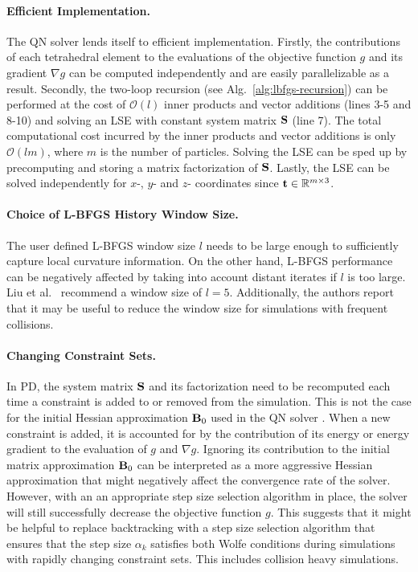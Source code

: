 \paragraph{Efficient Implementation.}
The QN solver lends itself to efficient implementation. Firstly, the contributions of each tetrahedral element to the evaluations of the objective function $g$ 
and its gradient $\nabla g$ can be computed independently and are easily parallelizable as a result. Secondly, the two-loop recursion (see Alg.\ 
\ref{alg:lbfgs-recursion}) can be performed at the cost of $\mathcal{O}(l)$ inner products and vector additions (lines 3-5 and 8-10) and solving an LSE with 
constant system matrix $\mathbf{S}$ (line 7). The total computational cost incurred by the inner products 
and vector additions is only $\mathcal{O}(lm)$, where $m$ is the number of particles. Solving the LSE can be sped up by precomputing and storing a matrix 
factorization of $\mathbf{S}$. Lastly, the LSE can be solved independently for $x$-, $y$- and $z$- coordinates since $\mathbf{t} \in \mathbb{R}^{m \times 3}$.

\paragraph{Choice of L-BFGS History Window Size.}
The user defined L-BFGS window size $l$ needs to be large enough to sufficiently capture local curvature information. On the other hand, L-BFGS performance can 
be negatively affected by taking into account distant iterates if $l$ is too large. Liu et al.\ \cite{liu2017} recommend a window size of $l = 5$. Additionally, the 
authors report that it may be useful to reduce the window size for simulations with frequent collisions.

\paragraph{Changing Constraint Sets.}
In PD, the system matrix $\mathbf{S}$ and its factorization need to be recomputed each time a constraint is added to or removed from the simulation. This is not the case 
for the initial Hessian approximation $\mathbf{B}_0$ used in the QN solver \cite{liu2017}. When a new constraint is added, it is accounted for by the contribution of its 
energy or energy gradient to the evaluation of $g$ and $\nabla g$. Ignoring its contribution to the initial matrix approximation $\mathbf{B}_0$ can be interpreted as a more 
aggressive Hessian approximation that might negatively affect the convergence rate of the solver. However, with an an appropriate step size selection algorithm in place, 
the solver will still successfully decrease the objective function $g$. This suggests that it might be helpful to replace backtracking with a step size selection 
algorithm that ensures that the step size $\alpha_k$ satisfies both Wolfe conditions during simulations with rapidly changing constraint sets. This includes collision 
heavy simulations.


